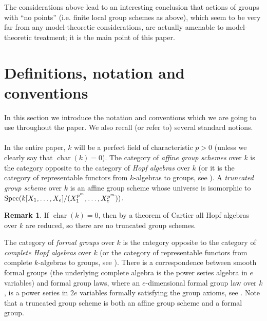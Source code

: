 \documentclass[10pt]{amsart}
\DeclareMathOperator{\ch}{char} \DeclareMathOperator{\reg}{reg} \DeclareMathOperator{\fin}{fin}
\theoremstyle{definition}
\newtheorem{remark}[theorem]{Remark}
\begin{document}
The considerations above lead to an interesting conclusion that actions of groups with ``no points'' (i.e. finite local group schemes as above), which seem to be very far from any model-theoretic considerations, are actually amenable to model-theoretic treatment; it is the main point of this paper.






\section{Definitions, notation and conventions}\label{secdef}
\noindent
In this section we introduce the notation and conventions which we are going to use throughout the paper. We also recall (or refer to) several standard notions.
\\
\\
In the entire paper, $k$ will be a perfect field of characteristic $p>0$ (unless we clearly say that $\ch(k)=0$). The category of \emph{affine group schemes} over $k$ is the category opposite to the category of \emph{Hopf algebras} over $k$ \cite[Section 1.4]{Water} (or it is the category of representable functors from $k$-algebras to groups, see \cite[Section 1.2]{Water}). A \emph{truncated group scheme} \cite{Chase2} over $k$ is an affine group scheme whose universe is  isomorphic to $\operatorname{Spec}(k[X_1,\ldots,X_e]/(X_1^{p^m},\ldots,X_e^{p^m}))$.
\begin{remark}\label{notrunzero}
If $\ch(k)=0$, then by a theorem of Cartier \cite[Section 11.4]{Water} all Hopf algebras over $k$ are reduced, so there are no truncated group schemes.
\end{remark}
\noindent
The category of \emph{formal groups} over $k$ is the category opposite to the category of \emph{complete Hopf algebras} over $k$ (or the category of representable functors from complete $k$-algebras to groups, see \cite[Chapter VII]{Hazew}). There is a correspondence between smooth formal groups (the underlying complete algebra is the power series algebra in $e$ variables) and formal group laws, where an $e$-dimensional formal group law over $k$, is a power series in $2e$ variables formally satisfying the group axioms, see \cite[Sect. 9.1]{Hazew}. Note that a truncated group scheme is both an affine group scheme and a formal group.
\end{document}
